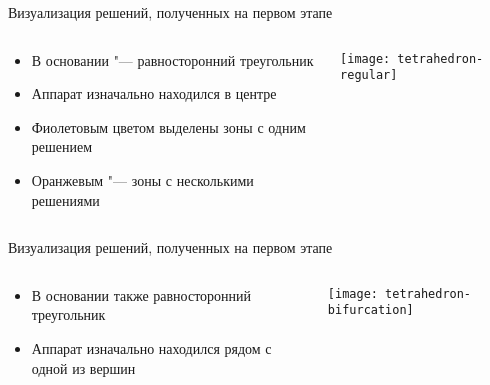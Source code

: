 \documentclass[russian,hyperref={unicode}]{beamer}
\begin{document}
  \appendix
  \begin{frame}{Визуализация решений, полученных на первом этапе}
    \begin{columns}[c]
      \begin{column}{.5\textwidth}
        \begin{itemize}
          \item В основании "--- равносторонний треугольник
          \item Аппарат изначально находился в центре
          \item Фиолетовым цветом выделены зоны с одним решением
          \item Оранжевым "--- зоны с несколькими решениями
        \end{itemize}
      \end{column}
      \begin{column}{.5\textwidth}
        \begin{center}
          \texttt{[image: tetrahedron-regular]}
        \end{center}
      \end{column}
    \end{columns}
  \end{frame}

  \begin{frame}{Визуализация решений, полученных на первом этапе}
    \begin{columns}[c]
      \begin{column}{.5\textwidth}
        \begin{itemize}
          \item В основании также равносторонний треугольник
          \item Аппарат изначально находился рядом с одной из вершин
        \end{itemize}
      \end{column}
      \begin{column}{.5\textwidth}
        \begin{center}
          \texttt{[image: tetrahedron-bifurcation]}
        \end{center}
      \end{column}
    \end{columns}
  \end{frame}
\end{document}
